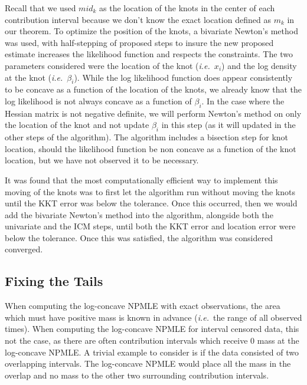\documentclass[10pt]{article}
\begin{document}
	Recall that we used $mid_k$ as the location of the knots in the center of each contribution interval because we don't know the exact location defined as $m_k$ in our theorem. To optimize the position of the knots, a bivariate Newton's method was used, with half-stepping of proposed steps to insure the new proposed estimate increases the likelihood function and respects the constraints. The two parameters considered were the location of the knot (\emph{i.e.}\ $x_i$) and the log density at the knot (\emph{i.e.}\ $\beta_i$). While the log likelihood function does appear consistently to be concave as a function of the location of the knots, we already know that the log likelihood is not always concave as a function of $\beta_i$. In the case where the Hessian matrix is not negative definite, we will perform Newton's method on only the location of the knot and not update $\beta_i$ in this step (as it will updated in the other steps of the algorithm). The algorithm includes a bisection step for knot location, should the likelihood function be non concave as a function of the knot location, but we have not observed it to be necessary. 
	
	It was found that the most computationally efficient way to implement this moving of the knots was to first let the algorithm run without moving the knots until the KKT error was below the tolerance. Once this occurred, then we would add the bivariate Newton's method into the algorithm, alongside both the univariate and the ICM steps, until both the KKT error and location error were below the tolerance. Once this was satisfied, the algorithm was considered converged. 
	
		{\subsection{Fixing the Tails} }
	
	When computing the log-concave NPMLE with exact observations, the area which must have positive mass is known in advance (\emph{i.e.}\ the range of all observed times). When computing the log-concave NPMLE for interval censored data, this not the case, as there are often contribution intervals which receive 0 mass at the log-concave NPMLE. A trivial example to consider is if the data consisted of two overlapping intervals. The log-concave NPMLE would place all the mass in the overlap and no mass to the other two surrounding contribution intervals.%
	 		
\end{document}
